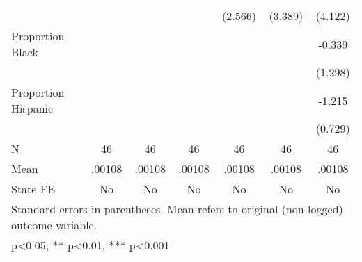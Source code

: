 {\begin{tabular}{l*{6}{c}}
                    &                     &                     &                     &     (2.566)         &     (3.389)         &     (4.122)         \\
\addlinespace
Proportion Black    &                     &                     &                     &                     &                     &      -0.339         \\
                    &                     &                     &                     &                     &                     &     (1.298)         \\
\addlinespace
Proportion Hispanic &                     &                     &                     &                     &                     &      -1.215         \\
                    &                     &                     &                     &                     &                     &     (0.729)         \\
\midrule
N                   &          46         &          46         &          46         &          46         &          46         &          46         \\
Mean                &      .00108         &      .00108         &      .00108         &      .00108         &      .00108         &      .00108         \\
State FE            &          No         &          No         &          No         &          No         &          No         &          No         \\
\bottomrule
\multicolumn{7}{l}{\footnotesize Standard errors in parentheses. Mean refers to original (non-logged) outcome variable.}\\
\multicolumn{7}{l}{\footnotesize * p<0.05, ** p<0.01, *** p<0.001}\\
\end{tabular}
}
